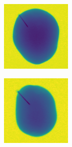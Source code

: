 \documentclass[11pt]{article}
\begin{document}
\begin{figure}[!h]
\begin{subfigure}[b]{0.22\textwidth}
         \caption{}
         \label{fig:metal_33}
     \end{subfigure}
     \hfill
     \begin{subfigure}[b]{0.22\textwidth}
         \centering
         \includegraphics[width=\textwidth]{figurer/potato_dataset/metal/metal_34.jpg}
         \caption{}
         \label{fig:metal_34}
     \end{subfigure}
     \hfill
     \begin{subfigure}[b]{0.22\textwidth}
         \centering
         \includegraphics[width=\textwidth]{figurer/potato_dataset/metal/metal_35.jpg}

\end{subfigure}
\end{figure}
\end{document}

